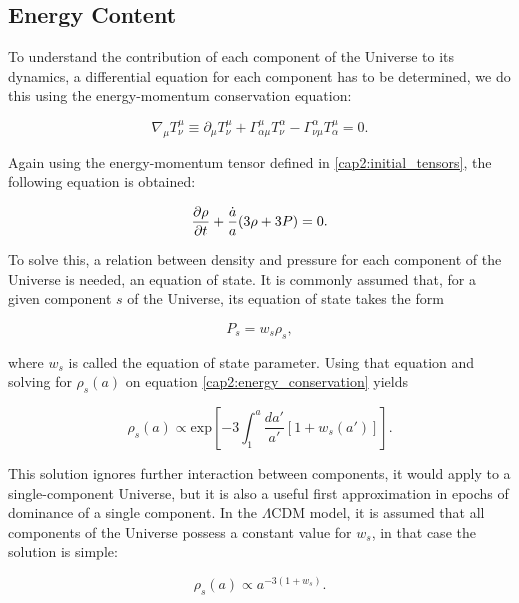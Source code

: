 \documentclass[openany,a4paper,12pt,oneside]{book}
\begin{document}
\begin{spacing}{1.5}
\subsection{Energy Content}\label{subsect:Ch2_Energy_Content}

To understand the contribution of each component of the Universe to its dynamics, a differential equation for each component has to be determined, we do this using the energy-momentum conservation equation:

\begin{equation}\label{energy_momentum_conservation}
    \nabla_\mu T^\mu_\nu\equiv \partial_\mu T^\mu_\nu+\Gamma^\mu_{\alpha\mu}T^\alpha_\nu-\Gamma^\alpha_{\nu\mu}T^\mu_\alpha=0.
\end{equation}

Again using the energy-momentum tensor defined in \eqref{cap2:initial_tensors}, the following equation is obtained:

\begin{equation}\label{cap2:energy_conservation}
    \pdv{\rho}{t}+\frac{\dot{a}}{a}(3\rho+3P)=0.
\end{equation}

To solve this, a relation between density and pressure for each component of the Universe is needed, an equation of state. It is commonly assumed that, for a given component $s$ of the Universe, its equation of state takes the form

\begin{equation}\label{ch2:eq_state}
    P_s=w_s\rho_s,
\end{equation}

\noindent where $w_s$ is called the equation of state parameter. Using that equation and solving for $\rho_s(a)$ on equation \eqref{cap2:energy_conservation} yields

\begin{equation}\label{ch2:rho_s(a)_general}
    \rho_s(a)\propto \text{exp}\left[-3\int_1^a \frac{da'}{a'}[1+w_s(a')]\right].
\end{equation}

This solution ignores further interaction between components, it would apply to a single-component Universe, but it is also a useful first approximation in epochs of dominance of a single component. In the $\Lambda$CDM model, it is assumed that all components of the Universe possess a constant value for $w_s$, in that case the solution is simple:

\begin{equation}\label{ch2:rho_s_ws_const}
    \rho_s(a)\propto a^{-3(1+w_s)}.
\end{equation}


\end{spacing}
\end{document}
